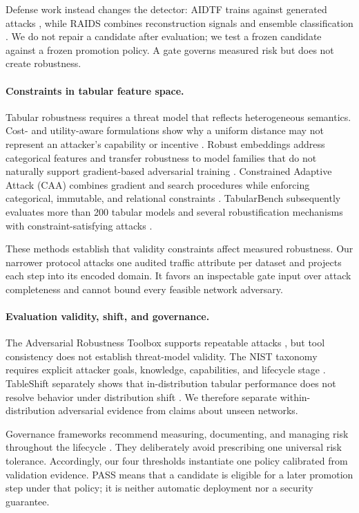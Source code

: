 \documentclass[runningheads]{llncs}
\begin{document}
Defense work instead changes the detector: AIDTF trains against generated attacks \cite{xiong2023aidtf}, while RAIDS combines reconstruction signals and ensemble classification \cite{sarikaya2023raids}. We do not repair a candidate after evaluation; we test a frozen candidate against a frozen promotion policy. A gate governs measured risk but does not create robustness.

\paragraph{Constraints in tabular feature space.}
Tabular robustness requires a threat model that reflects heterogeneous semantics. Cost- and utility-aware formulations show why a uniform distance may not represent an attacker's capability or incentive \cite{kireev2023cost}. Robust embeddings address categorical features and transfer robustness to model families that do not naturally support gradient-based adversarial training \cite{kireev2023embeddings}. Constrained Adaptive Attack (CAA) combines gradient and search procedures while enforcing categorical, immutable, and relational constraints \cite{simonetto2024caa}. TabularBench subsequently evaluates more than 200 tabular models and several robustification mechanisms with constraint-satisfying attacks \cite{simonetto2024tabularbench}.

These methods establish that validity constraints affect measured robustness. Our narrower protocol attacks one audited traffic attribute per dataset and projects each step into its encoded domain. It favors an inspectable gate input over attack completeness and cannot bound every feasible network adversary.

\paragraph{Evaluation validity, shift, and governance.}
The Adversarial Robustness Toolbox supports repeatable attacks \cite{nicolae2019art}, but tool consistency does not establish threat-model validity. The NIST taxonomy requires explicit attacker goals, knowledge, capabilities, and lifecycle stage \cite{vassilev2025taxonomy}. TableShift separately shows that in-distribution tabular performance does not resolve behavior under distribution shift \cite{gardner2023tableshift}. We therefore separate within-distribution adversarial evidence from claims about unseen networks.

Governance frameworks recommend measuring, documenting, and managing risk throughout the lifecycle \cite{tabassi2023airmf}. They deliberately avoid prescribing one universal risk tolerance. Accordingly, our four thresholds instantiate one policy calibrated from validation evidence. PASS means that a candidate is eligible for a later promotion step under that policy; it is neither automatic deployment nor a security guarantee.
\end{document}

